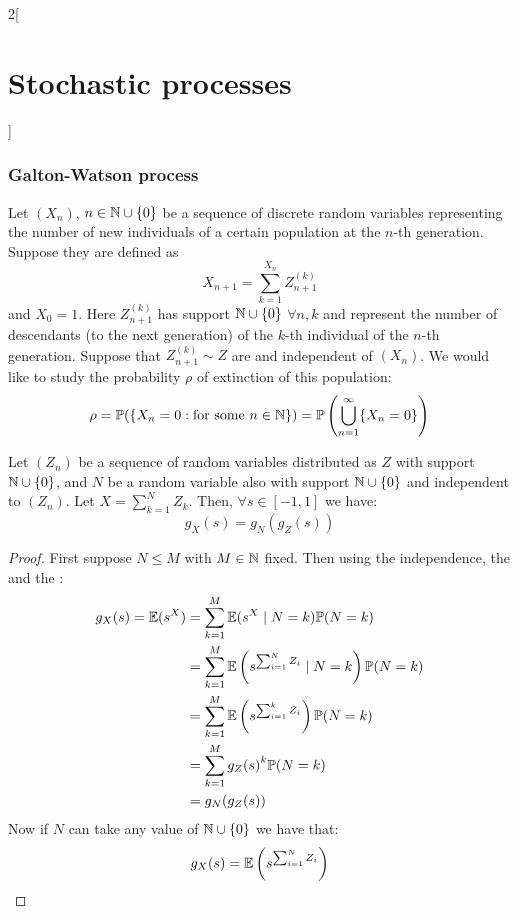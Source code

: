 \documentclass[../../../main_math.tex]{subfiles}
\begin{document}
\begin{multicols}{2}[\section{Stochastic processes}]
  \subsubsection{Galton-Watson process}
  \begin{model}\label{SP:galtonwatsonModel}
    Let $(X_n)$, $n\in\mathbb{N}\cup\{0\}$ be a sequence of discrete random variables representing the number of new individuals of a certain population at the $n$-th generation. Suppose they are defined as $$X_{n+1}=\sum_{k=1}^{X_n}Z_{n+1}^{(k)}$$ and $X_0=1$. Here $Z_{n+1}^{(k)}$ has support $\mathbb{N}\cup\{0\}$ $\forall n,k$ and represent the number of descendants (to the next generation) of the $k$-th individual of the $n$-th generation. Suppose that $Z_{n+1}^{(k)}\sim Z$ are \iid and independent of $(X_n)$. We would like to study the probability $\rho$ of extinction of this population: $$\rho=\mathbb{P}(\{X_n=0:\text{for some $n\in\mathbb{N}$}\})=\mathbb{P}\left(\bigcup_{n=1}^\infty\{X_n=0\}\right)$$
  \end{model}
  \begin{lemma}\label{SP:lemmaGaltonWatson}
    Let $(Z_n)$ be a sequence of \iid random variables distributed as $Z$ with support $\mathbb{N}\cup\{0\}$, and $N$ be a random variable also with support $\mathbb{N}\cup\{0\}$ and independent to $(Z_n)$. Let $X=\sum_{k=1}^NZ_k$. Then, $\forall s\in[-1,1]$ we have: $$g_X(s)=g_N(g_Z(s))$$
  \end{lemma}
  \begin{proof}
    First suppose $N\leq M$ with $M\in\mathbb{N}$ fixed. Then using the independence, the  and the :
    \begin{align*}
      g_X(s)=\mathbb{E}(s^X) & =\sum_{k=1}^M\mathbb{E}(s^X\mid N=k)\mathbb{P}(N=k)                                        \\
                       & = \sum_{k=1}^{M} \mathbb{E}\left(s^{\sum_{i=1}^{N}Z_i} \mid N = k\right) \mathbb{P}(N = k) \\
                       & = \sum_{k=1}^{M} \mathbb{E}\left(s^{\sum_{i=1}^{k}Z_i}\right) \mathbb{P}(N = k)            \\
                       & = \sum_{k=1}^{M} {g_Z(s)}^k \mathbb{P}(N = k)                                        \\
                       & = g_N(g_Z(s))
    \end{align*}
    Now if $N$ can take any value of $\mathbb{N}\cup\{0\}$ we have that:
    \begin{align*}
      g_X(s) & =\Exp\left(s^{\sum_{i=1}^{N}Z_i}\right)                          \\

\end{align*}
\end{proof}
\end{multicols}
\end{document}
